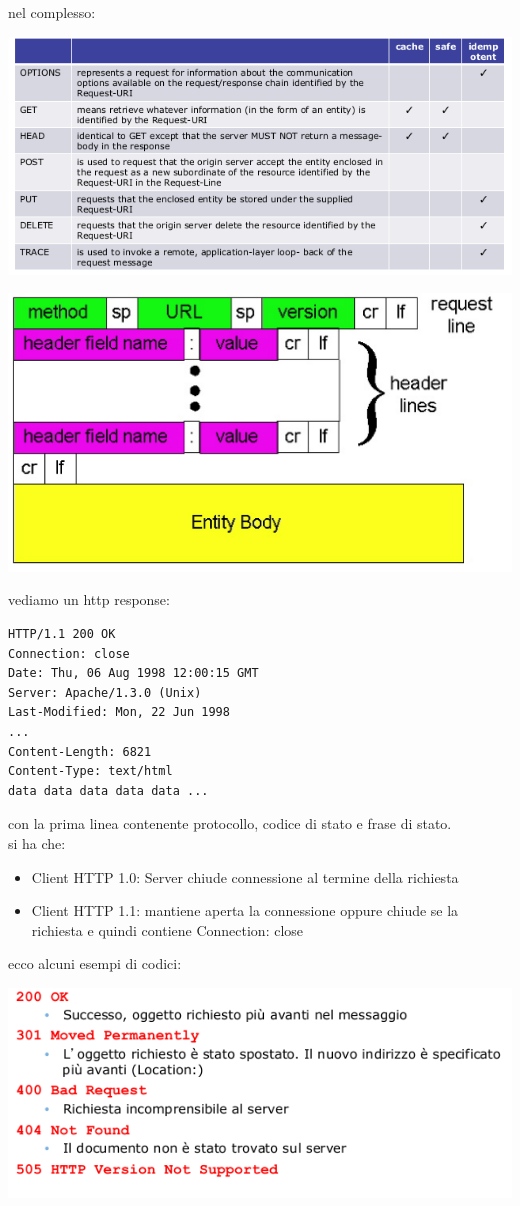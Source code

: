 \documentclass[a4paper,12pt, oneside]{book}
\begin{document}
nel complesso:
\begin{center}
	\includegraphics[scale=0.7]{img/http.png}
\end{center}
\begin{center}
	\includegraphics[scale=0.7]{img/http2.png}
\end{center}
vediamo un http response:
\begin{verbatim}
HTTP/1.1 200 OK
Connection: close
Date: Thu, 06 Aug 1998 12:00:15 GMT
Server: Apache/1.3.0 (Unix)
Last-Modified: Mon, 22 Jun 1998
...
Content-Length: 6821
Content-Type: text/html
data data data data data ...
\end{verbatim}
con la prima linea contenente protocollo, codice di stato e frase di stato.\\
si ha che:
\begin{itemize}
	\item Client HTTP 1.0: Server chiude connessione al termine della richiesta
	\item Client HTTP 1.1: mantiene aperta la connessione oppure chiude se la richiesta e quindi
	      contiene Connection: close
\end{itemize}
ecco alcuni esempi di codici:
\begin{center}
	\includegraphics[scale=0.7]{img/http3.png}
\end{center}
\end{document}
